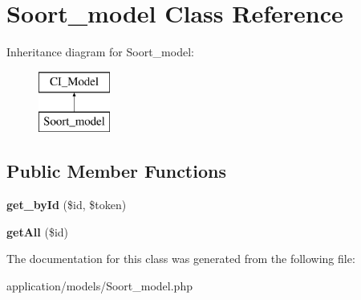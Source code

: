 \hypertarget{class_soort__model}{}\section{Soort\+\_\+model Class Reference}
\label{class_soort__model}
Inheritance diagram for Soort\+\_\+model\+:\begin{figure}[H]
\begin{center}
\leavevmode
\includegraphics[height=2.000000cm]{class_soort__model}
\end{center}
\end{figure}
\subsection*{Public Member Functions}
\begin{DoxyCompactItemize}
\item 
\mbox{\label{class_soort__model_a28a2efaf8d40808d5567d7972ba75ca0}} 
{\bfseries get\+\_\+by\+Id} (\$id, \$token)
\item 
\mbox{\label{class_soort__model_af7ccb69058c9250e64e9c11046349e26}} 
{\bfseries get\+All} (\$id)
\end{DoxyCompactItemize}


The documentation for this class was generated from the following file\+:\begin{DoxyCompactItemize}
\item 
application/models/Soort\+\_\+model.\+php\end{DoxyCompactItemize}
